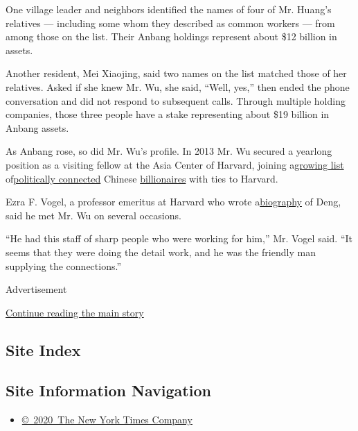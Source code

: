 One village leader and neighbors identified the names of four of Mr.
Huang's relatives --- including some whom they described as common
workers --- from among those on the list. Their Anbang holdings
represent about \$12 billion in assets.

Another resident, Mei Xiaojing, said two names on the list matched those
of her relatives. Asked if she knew Mr. Wu, she said, ``Well, yes,''
then ended the phone conversation and did not respond to subsequent
calls. Through multiple holding companies, those three people have a
stake representing about \$19 billion in Anbang assets.

As Anbang rose, so did Mr. Wu's profile. In 2013 Mr. Wu secured a
yearlong position as a visiting fellow at the Asia Center of Harvard,
joining
a\href{http://www.nytimes.com/2015/04/29/world/asia/wang-jianlin-abillionaire-at-the-intersection-of-business-and-power-in-china.html}{growing
list}
of\href{http://fairbank.fas.harvard.edu/pages/desmond-and-whitney-shum-fellows-details}{politically
connected} Chinese
\href{https://pubapps.hks.harvard.edu/enrollment/fellowships/fellowship.aspx?id=AshChina}{billionaires}
with ties to Harvard.

Ezra F. Vogel, a professor emeritus at Harvard who wrote
a\href{http://www.hup.harvard.edu/catalog.php?isbn=9780674725867}{biography}
of Deng, said he met Mr. Wu on several occasions.

``He had this staff of sharp people who were working for him,'' Mr.
Vogel said. ``It seems that they were doing the detail work, and he was
the friendly man supplying the connections.''

Advertisement

\protect\hyperlink{after-bottom}{Continue reading the main story}

\hypertarget{site-index}{%
\subsection{Site Index}\label{site-index}}

\hypertarget{site-information-navigation}{%
\subsection{Site Information
Navigation}\label{site-information-navigation}}

\begin{itemize}
\tightlist
\item
  \href{https://help.nytimes.com/hc/en-us/articles/115014792127-Copyright-notice}{©~2020~The
  New York Times Company}
\end{itemize}


